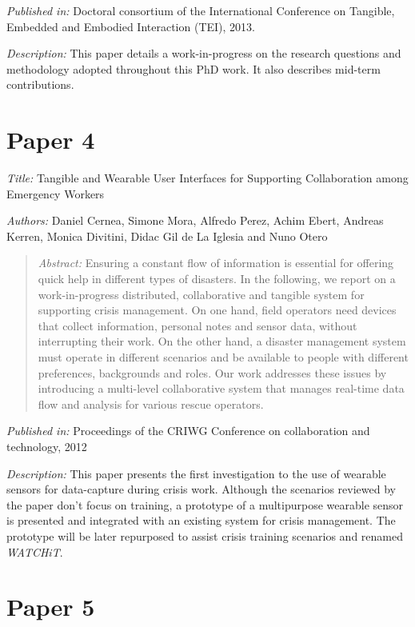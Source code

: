 \emph{Published in: }Doctoral consortium of the International Conference on Tangible, Embedded and Embodied Interaction (TEI), 2013.

\emph{Description: }This paper details a work-in-progress on the research questions and methodology adopted throughout this PhD work. It also describes mid-term contributions.

\section*{Paper 4}

\emph{Title: }Tangible and Wearable User Interfaces for Supporting Collaboration among Emergency Workers

\emph{Authors: }Daniel Cernea, Simone Mora, Alfredo Perez, Achim Ebert, Andreas Kerren, Monica Divitini, Didac Gil de La Iglesia and Nuno Otero

\begin{quote}
	\emph{Abstract: }Ensuring a constant flow of information is essential for offering quick help in different types of disasters. In the following, we report on a work-in-progress distributed, collaborative and tangible system for supporting crisis management. On one hand, field operators need devices that collect information, personal notes and sensor data, without interrupting their work. On the other hand, a disaster management system must operate in different scenarios and be available to people with different preferences, backgrounds and roles. Our work addresses these issues by introducing a multi-level collaborative system that manages real-time data flow and analysis for various rescue operators.
\end{quote}

\emph{Published in: }Proceedings of the CRIWG Conference on collaboration and technology, 2012

\emph{Description: }This paper presents the first investigation to the use of wearable sensors for data-capture during crisis work. Although the scenarios reviewed by the paper don't focus on training, a prototype of a multipurpose wearable sensor is presented and integrated with an existing system for crisis management. The prototype will be later repurposed to assist crisis training scenarios and renamed \emph{WATCHiT}.

\section*{Paper 5}

